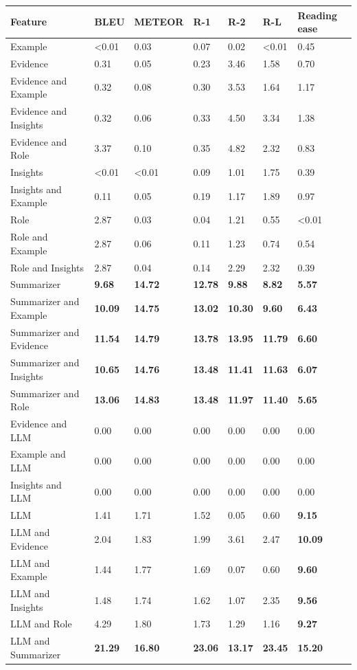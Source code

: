 \begin{tabular}{|l|l|l|l|l|l|l|}
\hline
\textbf{Feature} & BLEU & METEOR & R-1 & R-2 & R-L & Reading ease \\
 \hline
 Example & \textless{}0.01 & 0.03 & 0.07 & 0.02 & \textless{}0.01 & 0.45 \\
 \hline
 Evidence & 0.31 & 0.05 & 0.23 & 3.46 & 1.58 & 0.70 \\
 \hline
 Evidence and Example & 0.32 & 0.08 & 0.30 & 3.53 & 1.64 & 1.17 \\
 \hline
 Evidence and Insights & 0.32 & 0.06 & 0.33 & 4.50 & 3.34 & 1.38 \\
 \hline
 Evidence and Role & 3.37 & 0.10 & 0.35 & 4.82 & 2.32 & 0.83 \\
 \hline
 Insights & \textless{}0.01 & \textless{}0.01 & 0.09 & 1.01 & 1.75 & 0.39 \\
 \hline
 Insights and Example & 0.11 & 0.05 & 0.19 & 1.17 & 1.89 & 0.97 \\
 \hline
 Role & 2.87 & 0.03 & 0.04 & 1.21 & 0.55 & \textless{}0.01 \\
 \hline
 Role and Example & 2.87 & 0.06 & 0.11 & 1.23 & 0.74 & 0.54 \\
 \hline
 Role and Insights & 2.87 & 0.04 & 0.14 & 2.29 & 2.32 & 0.39 \\
 \hline
 Summarizer & \textbf{9.68} & \textbf{14.72} & \textbf{12.78} & \textbf{9.88} & \textbf{8.82} & \textbf{5.57} \\
 \hline
 Summarizer and Example & \textbf{10.09} & \textbf{14.75} & \textbf{13.02} & \textbf{10.30} & \textbf{9.60} & \textbf{6.43} \\
 \hline
 Summarizer and Evidence & \textbf{11.54} & \textbf{14.79} & \textbf{13.78} & \textbf{13.95} & \textbf{11.79} & \textbf{6.60} \\
 \hline
 Summarizer and Insights & \textbf{10.65} & \textbf{14.76} & \textbf{13.48} & \textbf{11.41} & \textbf{11.63} & \textbf{6.07} \\
 \hline
 Summarizer and Role & \textbf{13.06} & \textbf{14.83} & \textbf{13.48} & \textbf{11.97} & \textbf{11.40} & \textbf{5.65} \\
 \hline
 Evidence and LLM & 0.00 & 0.00 & 0.00 & 0.00 & 0.00 & 0.00 \\
 \hline
 Example and LLM & 0.00 & 0.00 & 0.00 & 0.00 & 0.00 & 0.00 \\
 \hline
 Insights and LLM & 0.00 & 0.00 & 0.00 & 0.00 & 0.00 & 0.00 \\
 \hline
 LLM & 1.41 & 1.71 & 1.52 & 0.05 & 0.60 & \textbf{9.15} \\
 \hline
 LLM and Evidence & 2.04 & 1.83 & 1.99 & 3.61 & 2.47 & \textbf{10.09} \\
 \hline
 LLM and Example & 1.44 & 1.77 & 1.69 & 0.07 & 0.60 & \textbf{9.60} \\
 \hline
 LLM and Insights & 1.48 & 1.74 & 1.62 & 1.07 & 2.35 & \textbf{9.56} \\
 \hline
 LLM and Role & 4.29 & 1.80 & 1.73 & 1.29 & 1.16 & \textbf{9.27} \\
 \hline
 LLM and Summarizer & \textbf{21.29} & \textbf{16.80} & \textbf{23.06} & \textbf{13.17} & \textbf{23.45} & \textbf{15.20} \\
\hline
\end{tabular}
